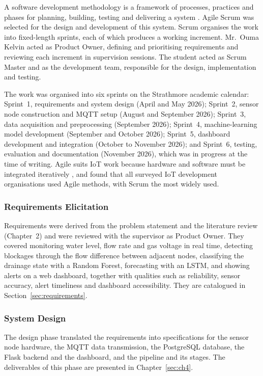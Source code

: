 \documentclass[12pt, a4paper]{article}
\begin{document}
A software development methodology is a framework of processes, practices and phases for planning, building, testing and delivering a system \citep{sommerville2016}. Agile Scrum was selected for the design and development of this system. Scrum organises the work into fixed-length sprints, each of which produces a working increment. Mr.~Ouma Kelvin acted as Product Owner, defining and prioritising requirements and reviewing each increment in supervision sessions. The student acted as Scrum Master and as the development team, responsible for the design, implementation and testing.

The work was organised into six sprints on the Strathmore academic calendar: Sprint~1, requirements and system design (April and May 2026); Sprint~2, sensor node construction and MQTT setup (August and September 2026); Sprint~3, data acquisition and preprocessing (September 2026); Sprint~4, machine-learning model development (September and October 2026); Sprint~5, dashboard development and integration (October to November 2026); and Sprint~6, testing, evaluation and documentation (November 2026), which was in progress at the time of writing. Agile suits IoT work because hardware and software must be integrated iteratively \citep{gouthaman2018}, and \citet{jusoh2019} found that all surveyed IoT development organisations used Agile methods, with Scrum the most widely used.

\subsubsection{Requirements Elicitation}

Requirements were derived from the problem statement and the literature review (Chapter~2) and were reviewed with the supervisor as Product Owner. They covered monitoring water level, flow rate and gas voltage in real time, detecting blockages through the flow difference between adjacent nodes, classifying the drainage state with a Random Forest, forecasting with an LSTM, and showing alerts on a web dashboard, together with qualities such as reliability, sensor accuracy, alert timeliness and dashboard accessibility. They are catalogued in Section~\ref{sec:requirements}.

\subsubsection{System Design}

The design phase translated the requirements into specifications for the sensor node hardware, the MQTT data transmission, the PostgreSQL database, the Flask backend and the dashboard, and the pipeline and its stages. The deliverables of this phase are presented in Chapter~\ref{sec:ch4}.
\end{document}

